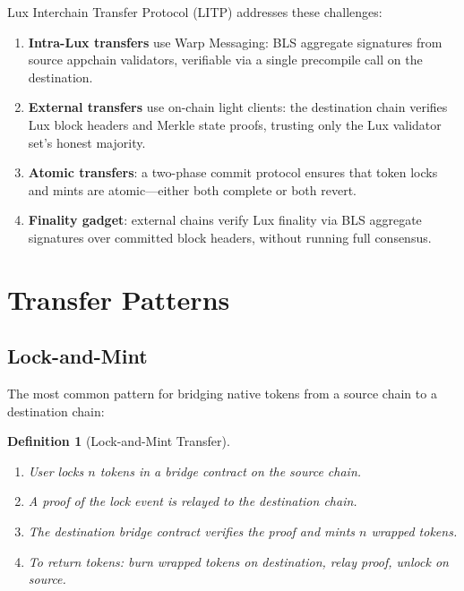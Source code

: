 \documentclass[11pt,a4paper]{article}
\newtheorem{definition}{Definition}
\begin{document}
Lux Interchain Transfer Protocol (LITP) addresses these challenges:

\begin{enumerate}[label=(\roman*)]
    \item \textbf{Intra-Lux transfers} use Warp Messaging: BLS aggregate signatures from source appchain validators, verifiable via a single precompile call on the destination.
    \item \textbf{External transfers} use on-chain light clients: the destination chain verifies Lux block headers and Merkle state proofs, trusting only the Lux validator set's honest majority.
    \item \textbf{Atomic transfers}: a two-phase commit protocol ensures that token locks and mints are atomic---either both complete or both revert.
    \item \textbf{Finality gadget}: external chains verify Lux finality via BLS aggregate signatures over committed block headers, without running full consensus.
\end{enumerate}

\section{Transfer Patterns}\label{sec:patterns}

\subsection{Lock-and-Mint}

The most common pattern for bridging native tokens from a source chain to a destination chain:

\begin{definition}[Lock-and-Mint Transfer]
\begin{enumerate}
    \item User locks $n$ tokens in a bridge contract on the source chain.
    \item A proof of the lock event is relayed to the destination chain.
    \item The destination bridge contract verifies the proof and mints $n$ wrapped tokens.
    \item To return tokens: burn wrapped tokens on destination, relay proof, unlock on source.
\end{enumerate}
\end{definition}
\end{document}
